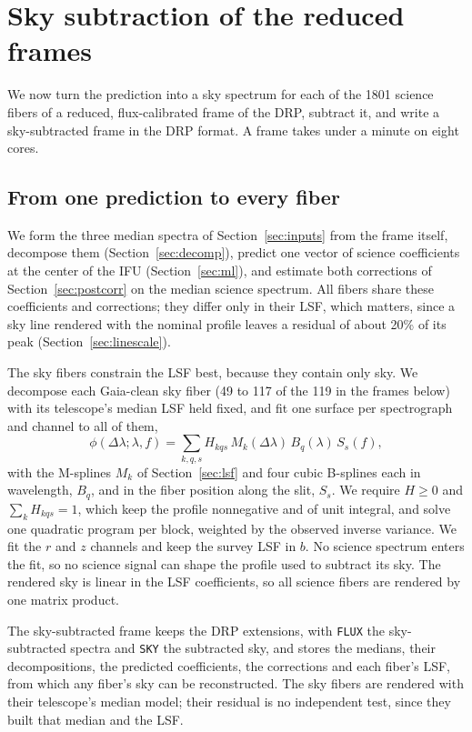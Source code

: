 \section{Sky subtraction of the reduced frames}
\label{sec:cframes}

We now turn the prediction into a sky spectrum for each of the 1801 science
fibers of a reduced, flux-calibrated frame of the DRP, subtract it, and write
a sky-subtracted frame in the DRP format. A frame takes under a minute on
eight cores.

\subsection{From one prediction to every fiber}
\label{sec:perfiber}

We form the three median spectra of Section~\ref{sec:inputs} from the frame
itself, decompose them (Section~\ref{sec:decomp}), predict one vector of
science coefficients at the center of the IFU (Section~\ref{sec:ml}), and
estimate both corrections of Section~\ref{sec:postcorr} on the median
science spectrum. All fibers share these coefficients and corrections; they
differ only in their LSF, which matters, since a sky line rendered with the
nominal profile leaves a residual of about 20\% of its peak
(Section~\ref{sec:linescale}).

The sky fibers constrain the LSF best, because they contain only sky. We
decompose each Gaia-clean sky fiber (49 to 117 of the 119 in the frames
below) with its telescope's median LSF held fixed, and fit one surface per
spectrograph and channel to all of them,
\begin{equation}
  \phi(\Delta\lambda;\lambda,f)=\sum_{k,q,s}H_{kqs}\,M_k(\Delta\lambda)\,
  B_q(\lambda)\,S_s(f),
\end{equation}
with the M-splines $M_k$ of Section~\ref{sec:lsf} and four cubic B-splines
each in wavelength, $B_q$, and in the fiber position along the slit, $S_s$.
We require $H\ge0$ and $\sum_k H_{kqs}=1$, which keep the profile
nonnegative and of unit integral, and solve one quadratic program per block,
weighted by the observed inverse variance. We fit the $r$ and $z$ channels
and keep the survey LSF in $b$. No science spectrum enters the fit, so no
science signal can shape the profile used to subtract its sky. The rendered
sky is linear in the LSF coefficients, so all science fibers are rendered
by one matrix product.

The sky-subtracted frame keeps the DRP extensions, with \texttt{FLUX} the
sky-subtracted spectra and \texttt{SKY} the subtracted sky, and stores the
medians, their decompositions, the predicted coefficients, the corrections
and each fiber's LSF, from which any fiber's sky can be reconstructed. The
sky fibers are rendered with their telescope's median model; their residual
is no independent test, since they built that median and the LSF.

